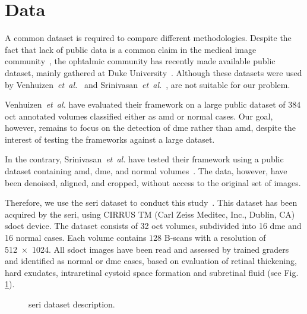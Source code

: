\graphicspath{ {./content/method/figures/} }

\section{Data}\label{sec:data}
A common dataset is required to compare different methodologies.
Despite the fact that lack of public data is a common claim in the medical image community~\cite{giger2008anniversary}, the ophtalmic community has recently made available public dataset, mainly gathered at Duke University~\cite{farsiu2014quantitative,Srinivasan2014}.
Although these datasets were used by Venhuizen~\emph{et~al.}~\cite{Venhuizen2015} and Srinivasan~\emph{et~al.}~\cite{Srinivasan2014}, are not suitable for our problem.

Venhuizen~\emph{et~al.} have evaluated their framework on a large public dataset of $384$ \gls{oct} annotated volumes classified either as \gls{amd} or normal cases.
Our goal, however, remains to focus on the detection of \gls{dme} rather than \gls{amd}, despite the interest of testing the frameworks against a large dataset.

In the contrary, Srinivasan~\emph{et~al.} have tested their framework using a public dataset containing \gls{amd}, \gls{dme}, and normal volumes~\cite{Srinivasan2014}.
The data, however, have been denoised, aligned, and cropped, without access to the original set of images.

Therefore, we use the \gls{seri} dataset to conduct this study~\cite{seri2016apr-repoICPR}.
This dataset has been acquired by the \gls{seri}, using CIRRUS TM (Carl Zeiss Meditec, Inc., Dublin, CA) \gls{sdoct} device.
The dataset consists of 32 \gls{oct} volumes, subdivided into 16 \gls{dme} and 16 normal cases.
Each volume contains $128$ B-scans with a resolution of \SI[product-units=repeat]{512x1024}{\px}.
All \gls{sdoct} images have been read and assessed by trained graders and identified as normal or \gls{dme} cases, based on evaluation of retinal thickening, hard exudates, intraretinal cystoid space formation and subretinal fluid (see Fig.\,\ref{fig:bbdd}).

\begin{figure}
    \caption{\gls{seri} dataset description.}
  \label{fig:bbdd}
\end{figure}
